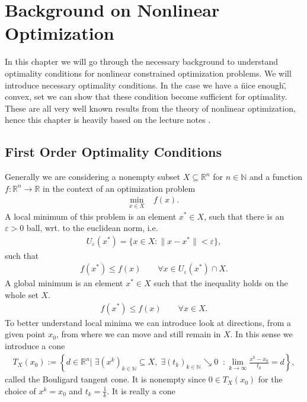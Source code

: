 \chapter{Background on Nonlinear Optimization}
In this chapter we will go through the necessary background to understand
optimality conditions for nonlinear constrained optimization problems. We
will introduce necessary optimality conditions. In the case we have a \"nice
enough\", convex, set we can show that these condition become sufficient for
optimality. These are all very well known results from the theory of
nonlinear optimization, hence this chapter is heavily based on the lecture
notes \cite{bot_optimization}.
\section{First Order Optimality Conditions}
Generally we are considering a nonempty subset $X \subseteq \mathbb{R}^{n}$
for $n \in \mathbb{N}$ and a function $f: \mathbb{R}^{n}  \to \mathbb{R}$ in
the context of an optimization problem
\begin{align}
    \min_{x \in X}\; &f(x) \label{eq: basic_opt}.
\end{align}
A local minimum of this problem is an element $x^{*} \in X$,
such that there is an $\varepsilon > 0$ ball, wrt. to the euclidean norm,
i.e.
\begin{align}
    U_\varepsilon(x^{*}) = \{x \in X: \|x - x^{*}\| < \varepsilon\},
\end{align}
such that
\begin{align}
    f(x^{*} ) \le f(x) \qquad \forall x \in U_\varepsilon(x^{*})\cap X.
\end{align}
A global minimum is an element $x^{*} \in X$ such that the inequality holds
on the whole set $X$.
\begin{align}
    f(x^{*}) \le f(x) \qquad \forall x \in X.
\end{align}
To better understand local minima we can introduce look at directions, from a
given point $x_0$, from where we can move and still remain in $X$. In this
sense we introduce a cone
\begin{align}
    T_X(x_0) := \left\{ d \in \mathbb{R}^{n}\Big|\;\exists (x^k)_{k \in
    \mathbb{N}} \subseteq X,\; \exists (t_k)_{k \in \mathbb{N} }\searrow
0\;\; : \lim_{k \to \infty} \frac{x^k-x_0}{t_k} = d  \right\},
\end{align}
called the Bouligard tangent cone. It is nonempty since $0 \in T_X(x_0)$ for
the choice of $x^{k} = x_0$ and $t_k = \frac{1}{k}$. It is really a cone
